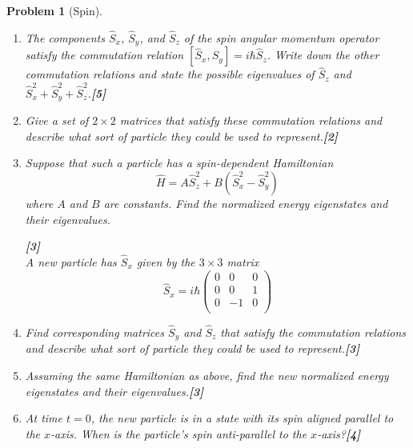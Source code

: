 \documentclass[a4paper]{article}
\theoremstyle{new}
\newtheorem{qns}{Problem}[subsection]
\begin{document}
\begin{qns}[Spin]\leavevmode
\begin{enumerate}[label=(\roman*)]
\item The components $\hat{S}_x$, $\hat{S}_y$, and $\hat{S}_z$ of the spin angular momentum operator satisfy the commutation relation $[\hat{S}_x,\hat{S}_y]=i\hbar\hat{S}_z$. Write down the other commutation relations and state the possible eigenvalues of $\hat{S}_z$ and $\hat{S}_x^2+\hat{S}_y^2+\hat{S}_z^2$.\hfill\textbf{[5]}
\item Give a set of $2\times 2$ matrices that satisfy these commutation relations and describe what sort of particle they could be used to represent.\hfill\textbf{[2]}
\item Suppose that such a particle has a spin-dependent Hamiltonian
$$\hat{H}=A\hat{S}_z^2+B(\hat{S}_x^2-\hat{S}_y^2)$$
where $A$ and $B$ are constants. Find the normalized energy eigenstates and their eigenvalues.

\hfill\textbf{[3]}\\[5pt]
A new particle has $\hat{S}_x$ given by the $3\times 3$ matrix
$$\hat{S}_x=i\hbar\begin{pmatrix}0&0&0\\0&0&1\\0&-1&0\\\end{pmatrix}$$
\item Find corresponding matrices $\hat{S}_y$ and $\hat{S}_z$ that satisfy the commutation relations and describe what sort of particle they could be used to represent.\hfill\textbf{[3]}
\item Assuming the same Hamiltonian as above, find the new normalized energy eigenstates and their eigenvalues.\hfill\textbf{[3]}
\item At time $t = 0$, the new particle is in a state with its spin aligned parallel to the $x$-axis. When is the particle’s spin anti-parallel to the $x$-axis?\hfill\textbf{[4]}
\end{enumerate}
\begin{mdframed}
\color{darkblue}{The Pauli matrices are $\sigma^1=\begin{pmatrix}0&1\\1&0\\\end{pmatrix}$, $\sigma^2=\begin{pmatrix}0&-i\\i&0\\\end{pmatrix}$, and $\sigma^3=\begin{pmatrix}1&0\\0&-1\\\end{pmatrix}$.}
\end{mdframed}
\end{qns}
\end{document}
